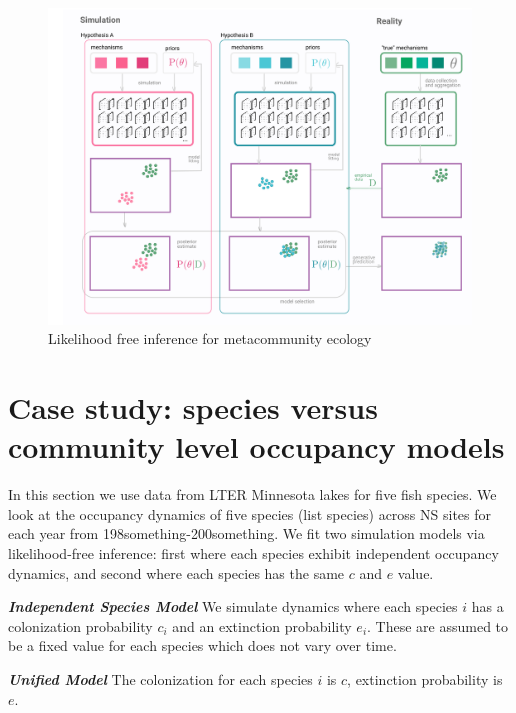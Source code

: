 \documentclass[11pt]{article}
\makeatletter
\def\maxwidth{\ifdim\Gin@nat@width>\linewidth\linewidth
\else\Gin@nat@width\fi}
\let\Oldincludegraphics\includegraphics
\renewcommand{\includegraphics}[1]{\Oldincludegraphics[width=\maxwidth]{#1}}
\makeatother
\begin{document}
\begin{figure}
\hypertarget{fig:information}{%
\centering
\includegraphics{./figures/likelihoodfreeinference.png}
\caption{Likelihood free inference for metacommunity
ecology}\label{fig:information}
}
\end{figure}

\hypertarget{case-study-species-versus-community-level-occupancy-models}{%
\section{Case study: species versus community level occupancy
models}\label{case-study-species-versus-community-level-occupancy-models}}

In this section we use data from LTER Minnesota lakes for five fish
species. We look at the occupancy dynamics of five species (list
species) across NS sites for each year from 198something-200something.
We fit two simulation models via likelihood-free inference: first where
each species exhibit independent occupancy dynamics, and second where
each species has the same \(c\) and \(e\) value.

\textbf{\emph{Independent Species Model}} We simulate dynamics where
each species \(i\) has a colonization probability \(c_i\) and an
extinction probability \(e_i\). These are assumed to be a fixed value
for each species which does not vary over time.

\textbf{\emph{Unified Model}} The colonization for each species \(i\) is
\(c\), extinction probability is \(e\).
\end{document}
